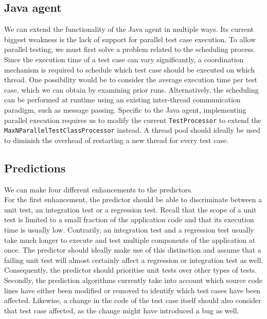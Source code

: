 \subsection{Java agent}
We can extend the functionality of the Java agent in multiple ways. Its current biggest weakness is the lack of support for parallel test case execution. To allow parallel testing, we must first solve a problem related to the scheduling process. Since the execution time of a test case can vary significantly, a coordination mechanism is required to schedule which test case should be executed on which thread. One possibility would be to consider the average execution time per test case, which we can obtain by examining prior runs. Alternatively, the scheduling can be performed at runtime using an existing inter-thread communication paradigm, such as message passing. Specific to the Java agent, implementing parallel execution requires us to modify the current \texttt{TestProcessor} to extend the \texttt{MaxNParallelTestClassProcessor} instead. A thread pool should ideally be used to diminish the overhead of restarting a new thread for every test case.

\subsection{Predictions}
We can make four different enhancements to the predictors.\\

\noindent For the first enhancement, the predictor should be able to discriminate between a unit test, an integration test or a regression test. Recall that the scope of a unit test is limited to a small fraction of the application code and that its execution time is usually low. Contrarily, an integration test and a regression test usually take much longer to execute and test multiple components of the application at once. The predictor should ideally make use of this distinction and assume that a failing unit test will almost certainly affect a regression or integration test as well. Consequently, the predictor should prioritise unit tests over other types of tests.\\

\noindent Secondly, the prediction algorithms currently take into account which source code lines have either been modified or removed to identify which test cases have been affected. Likewise, a change in the code of the test case itself should also consider that test case affected, as the change might have introduced a bug as well.\\


